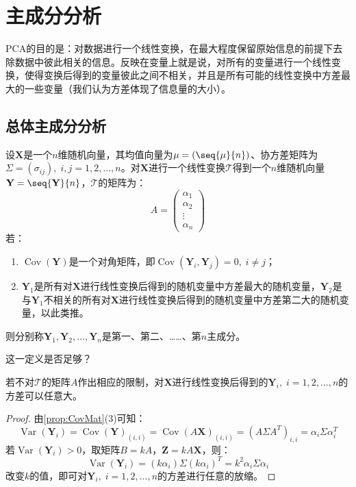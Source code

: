 \section{主成分分析}

\gls{PCA}的目的是：对数据进行一个线性变换，在最大程度保留原始信息的前提下去除数据中彼此相关的信息。反映在变量上就是说，对所有的变量进行一个线性变换，使得变换后得到的变量彼此之间不相关，并且是所有可能的线性变换中方差最大的一些变量（我们认为方差体现了信息量的大小）。

\subsection{总体主成分分析}
\begin{definition}
	设$\mathbf{X}$是一个$n$维随机向量，其均值向量为$\mu=(\seq{\mu}{n})$、协方差矩阵为$\Sigma=(\sigma_{ij}),\;i,j=1,2,\dots,n$。对$\mathbf{X}$进行一个线性变换$\mathcal{T}$得到一个$n$维随机向量$\mathbf{Y}=\seq{\mathbf{Y}}{n}$，$\mathcal{T}$的矩阵为：
	\begin{equation*}
		A=
		\begin{pmatrix}
			\alpha_1 \\
			\alpha_2 \\
			\vdots \\
			\alpha_n
		\end{pmatrix}
	\end{equation*}
	若：
	\begin{enumerate}
		\item $\operatorname{Cov}(\mathbf{Y})$是一个对角矩阵，即$\operatorname{Cov}(\mathbf{Y}_i,\mathbf{Y}_j)=0,\;i\ne j$；
		\item $\mathbf{Y}_1$是所有对$\mathbf{X}$进行线性变换后得到的随机变量中方差最大的随机变量，$\mathbf{Y}_2$是与$\mathbf{Y}_1$不相关的所有对$\mathbf{X}$进行线性变换后得到的随机变量中方差第二大的随机变量，以此类推。
	\end{enumerate}
	则分别称$\mathbf{Y}_1,\mathbf{Y}_2,\dots,\mathbf{Y}_n$是第一、第二、……、第$n$主成分。
\end{definition}
这一定义是否足够？
\begin{theorem}
	若不对$\mathcal{T}$的矩阵$A$作出相应的限制，对$\mathbf{X}$进行线性变换后得到的$\mathbf{Y}_i,\;i=1,2,\dots,n$的方差可以任意大。
\end{theorem}
\begin{proof}
	由\cref{prop:CovMat}(3)可知：
	\begin{equation*}
		\operatorname{Var}(\mathbf{Y}_i)=\operatorname{Cov}(\mathbf{Y})_{(i,i)}=\operatorname{Cov}(A\mathbf{X})_{(i,i)}=(A\Sigma A^T)_{i,i}=\alpha_i\Sigma\alpha_i^T
	\end{equation*}
	若$\operatorname{Var}(\mathbf{Y}_i)>0$，取矩阵$B=kA$，$\mathbf{Z}=kA\mathbf{X}$，则：
	\begin{equation*}
		\operatorname{Var}(\mathbf{Y}_i)=(k\alpha_i)\Sigma(k\alpha_i)^T=k^2\alpha_i\Sigma\alpha_i
	\end{equation*}
	改变$k$的值，即可对$\mathbf{Y}_i,\;i=1,2,\dots,n$的方差进行任意的放缩。
\end{proof}
